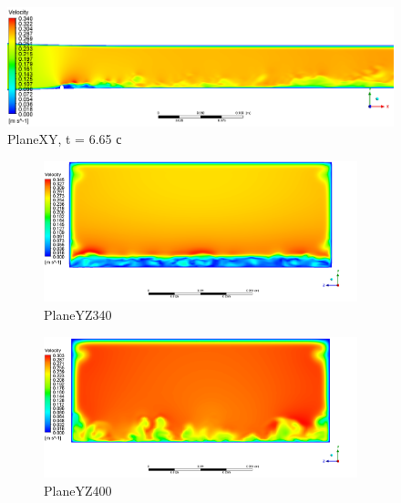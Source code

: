 \begin{figure}[H]
	\centering
	\includegraphics[width=1\linewidth]{../Assets/T665_Velocity_ContourXY}
	\caption{PlaneXY, t = 6.65 с}
	\label{fig:t665velocitycontourxy}
\end{figure}
\begin{figure}[H]
	\begin{subfigure}{.5\textwidth}
		\centering
		\includegraphics[width=1.1\linewidth]{../Assets/T665_Velocity_ContourYZ340}
		\caption{PlaneYZ340}
		\label{fig:T665VelocityContourYZ340}
	\end{subfigure}%
	\begin{subfigure}{.5\textwidth}
		\centering
		\includegraphics[width=1.1\linewidth]{../Assets/T665_Velocity_ContourYZ400}
		\caption{PlaneYZ400}
		\label{fig:T665VelocityContourYZ400}
	\end{subfigure}
	\\
	\begin{subfigure}{.5\textwidth}

\end{subfigure}
\end{figure}
